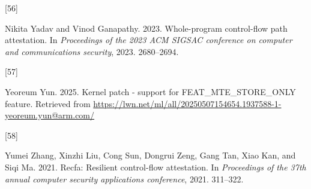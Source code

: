 \documentclass[a4paper, nobind]{templates/ociamthesis}
\newlength{\cslhangindent}
\newlength{\csllabelwidth}
\newenvironment{CSLReferences}[2] %
{\begin{list}{}{%
	\setlength{\itemindent}{0pt}
	\setlength{\leftmargin}{0pt}
	\setlength{\parsep}{0pt}
	\ifodd #1
	\setlength{\leftmargin}{\cslhangindent}
	\setlength{\itemindent}{-1\cslhangindent}
	\fi
	\setlength{\itemsep}{#2\baselineskip}}}
{\end{list}}
\newcommand{\CSLLeftMargin}[1]{\parbox[t]{\csllabelwidth}{\strut#1\strut}}
\newcommand{\CSLRightInline}[1]{\parbox[t]{\linewidth - \csllabelwidth}{\strut#1\strut}}
\begin{document}
\begin{CSLReferences}{0}{0}
\CSLLeftMargin{{[}56{]} }%
\CSLRightInline{Nikita Yadav and Vinod Ganapathy. 2023. Whole-program control-flow path attestation. In \emph{Proceedings of the 2023 ACM SIGSAC conference on computer and communications security}, 2023. 2680--2694.}

\CSLLeftMargin{{[}57{]} }%
\CSLRightInline{Yeoreum Yun. 2025. Kernel patch - support for FEAT\_MTE\_STORE\_ONLY feature. Retrieved from \url{https://lwn.net/ml/all/20250507154654.1937588-1-yeoreum.yun@arm.com/}}

\CSLLeftMargin{{[}58{]} }%
\CSLRightInline{Yumei Zhang, Xinzhi Liu, Cong Sun, Dongrui Zeng, Gang Tan, Xiao Kan, and Siqi Ma. 2021. Recfa: Resilient control-flow attestation. In \emph{Proceedings of the 37th annual computer security applications conference}, 2021. 311--322.}

\end{CSLReferences}

\end{document}
